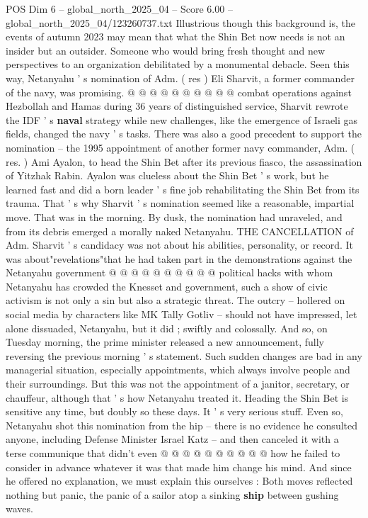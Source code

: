 \begin{textsample}{POS Dim 6 – global\_north\_2025\_04 – Score 6.00 – global\_north\_2025\_04/123260737.txt}
Illustrious though this background is, the events of autumn 2023 may mean that what the Shin Bet now needs is not an insider but an outsider.
Someone who would bring fresh thought and new perspectives to an organization debilitated by a monumental debacle.
Seen this way, Netanyahu ' s nomination of Adm. ( res ) Eli Sharvit, a former commander of the navy, was promising. @ @ @ @ @ @ @ @ @ @ combat operations against Hezbollah and Hamas during 36 years of distinguished service, Sharvit rewrote the IDF ' s \textbf{naval} strategy while new challenges, like the emergence of Israeli gas fields, changed the navy ' s tasks.
There was also a good precedent to support the nomination -- the 1995 appointment of another former navy commander, Adm. ( res. ) Ami Ayalon, to head the Shin Bet after its previous fiasco, the assassination of Yitzhak Rabin.
Ayalon was clueless about the Shin Bet ' s work, but he learned fast and did a born leader ' s fine job rehabilitating the Shin Bet from its trauma.
That ' s why Sharvit ' s nomination seemed like a reasonable, impartial move.
That was in the morning.
By dusk, the nomination had unraveled, and from its debris emerged a morally naked Netanyahu.
THE CANCELLATION of Adm.
Sharvit ' s candidacy was not about his abilities, personality, or record.
It was about"revelations"that he had taken part in the demonstrations against the Netanyahu government @ @ @ @ @ @ @ @ @ @ political hacks with whom Netanyahu has crowded the Knesset and government, such a show of civic activism is not only a sin but also a strategic threat.
The outcry -- hollered on social media by characters like MK Tally Gotliv -- should not have impressed, let alone dissuaded, Netanyahu, but it did ; swiftly and colossally.
And so, on Tuesday morning, the prime minister released a new announcement, fully reversing the previous morning ' s statement.
Such sudden changes are bad in any managerial situation, especially appointments, which always involve people and their surroundings.
But this was not the appointment of a janitor, secretary, or chauffeur, although that ' s how Netanyahu treated it.
Heading the Shin Bet is sensitive any time, but doubly so these days.
It ' s very serious stuff.
Even so, Netanyahu shot this nomination from the hip -- there is no evidence he consulted anyone, including Defense Minister Israel Katz -- and then canceled it with a terse communique that didn't even @ @ @ @ @ @ @ @ @ @ how he failed to consider in advance whatever it was that made him change his mind.
And since he offered no explanation, we must explain this ourselves : Both moves reflected nothing but panic, the panic of a sailor atop a sinking \textbf{ship} between gushing waves.

\end{textsample}
